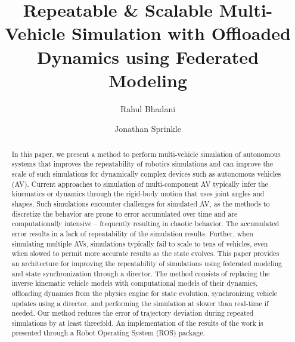 \documentclass[aps,pra,twocolumn,notitlepage,nofootinbib,superscriptaddress]{revtex4-1}
\newcommand{\booktitle}{Repeatable \& Scalable Multi-Vehicle Simulation with Offloaded Dynamics using Federated Modeling}
\begin{document}
\title{\booktitle}

\author{Rahul Bhadani}
\author{Jonathan Sprinkle}


\begin{abstract}
In this paper, we present a method to perform multi-vehicle simulation of autonomous systems that improves the repeatability of robotics simulations and can improve the scale of such simulations for dynamically complex devices such as autonomous vehicles (AV). Current approaches to simulation of multi-component AV typically infer the kinematics or dynamics through the rigid-body motion that uses joint angles and shapes. Such simulations encounter challenges for simulated AV, as the methods to discretize the behavior are prone to error accumulated over time and are computationally intensive -- frequently resulting in chaotic behavior. The accumulated error results in a lack of repeatability of the simulation results. Further, when simulating multiple AVs, simulations typically fail to scale to tens of vehicles, even when slowed to permit more accurate results as the state evolves. This paper provides an architecture for improving the repeatability of simulations using federated modeling and state synchronization through a director. The method consists of replacing the inverse kinematic vehicle models with computational models of their dynamics, offloading dynamics from the physics engine for state evolution, synchronizing vehicle updates using a director, and performing the simulation at slower than real-time if needed. Our method reduces the error of trajectory deviation during repeated simulations by at least threefold.  An implementation of the results of the work is presented through a Robot Operating System (ROS) package. 
\end{abstract}

\maketitle
\end{document}
